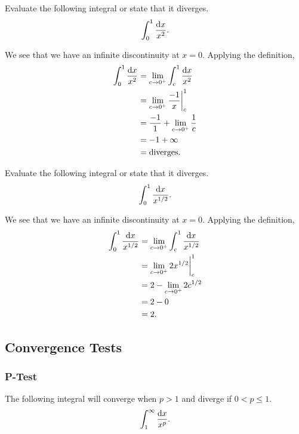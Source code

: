 \begin{example}
	Evaluate the following integral or state that it diverges.
	\begin{equation*}
		\int_{0}^{1}{\frac{\mathrm{d} x}{x^2}}.
	\end{equation*}
\end{example}
\begin{answer}
	We see that we have an infinite discontinuity at $x=0$.
	Applying the definition,
	\begin{align*}
		\int_{0}^{1}{\frac{\mathrm{d} x}{x^2}} &= \lim_{c\to 0^+}{\int_{c}^{1}{\frac{\mathrm{d} x}{x^2}}} \\
		&= \lim_{c\to 0^+}{\frac{-1}{x}\biggr\rvert_{c}^{1}} \\
		&= \frac{-1}{1} + \lim_{c\to 0^+}{\frac{1}{c}} \\
		&= -1 + \infty \\
		&= \text{diverges}.
	\end{align*}
\end{answer}

\begin{example}
	Evaluate the following integral or state that it diverges.
	\begin{equation*}
		\int_{0}^{1}{\frac{\mathrm{d} x}{x^{1/2}}}.
	\end{equation*}
\end{example}
\begin{answer}
	We see that we have an infinite discontinuity at $x=0$.
	Applying the definition,
	\begin{align*}
		\int_{0}^{1}{\frac{\mathrm{d} x}{x^{1/2}}} &= \lim_{c\to 0^+}{\int_{c}^{1}{\frac{\mathrm{d} x}{x^{1/2}}}} \\
		&= \lim_{c\to 0^+}{2x^{1/2}\biggr\rvert_{c}^{1}} \\
		&= 2 - \lim_{c\to 0^+}{2c^{1/2}} \\
		&= 2 - 0 \\
		&= 2.
	\end{align*}
\end{answer}

\subsection{Convergence Tests}
\subsubsection{P-Test}
\begin{lemma}
	The following integral will converge when $p > 1$ and diverge if $0 < p \leq 1$.
	\begin{equation*}
		\int_{1}^{\infty}{\frac{\mathrm{d} x}{x^p}}.
	\end{equation*}
\end{lemma}

